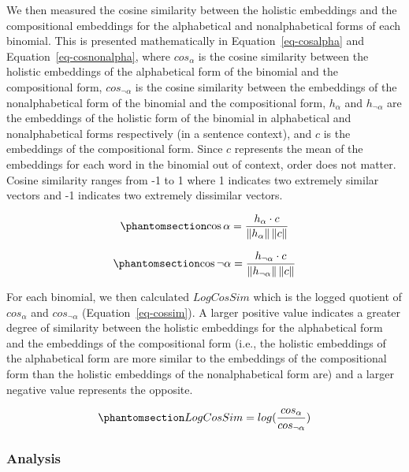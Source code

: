 \documentclass[
  12pt,
  letterpaper,
]{scrreprt}
\begin{document}
We then measured the cosine similarity between the holistic embeddings
and the compositional embeddings for the alphabetical and
nonalphabetical forms of each binomial. This is presented mathematically
in Equation~\ref{eq-cosalpha} and Equation~\ref{eq-cosnonalpha}, where
\(cos_\alpha\) is the cosine similarity between the holistic embeddings
of the alphabetical form of the binomial and the compositional form,
\(cos_{\neg\alpha}\) is the cosine similarity between the embeddings of
the nonalphabetical form of the binomial and the compositional form,
\(h_\alpha\) and \(h_{\neg\alpha}\) are the embeddings of the holistic
form of the binomial in alphabetical and nonalphabetical forms
respectively (in a sentence context), and \(c\) is the embeddings of the
compositional form. Since \(c\) represents the mean of the embeddings
for each word in the binomial out of context, order does not matter.
Cosine similarity ranges from -1 to 1 where 1 indicates two extremely
similar vectors and -1 indicates two extremely dissimilar vectors.

\begin{equation}\phantomsection\label{eq-cosalpha}{
\cos \alpha = \frac{h_\alpha \cdot c}{\left\lVert h_\alpha \right\rVert \left\lVert c \right\rVert}
}\end{equation}

\begin{equation}\phantomsection\label{eq-cosnonalpha}{
\cos \neg\alpha = \frac{h_{\neg\alpha} \cdot c}{\left\lVert h_{\neg\alpha}\right\rVert \left\lVert c \right\rVert}
}\end{equation}

For each binomial, we then calculated \(LogCosSim\) which is the logged
quotient of \(cos_\alpha\) and \(cos_{\neg\alpha}\)
(Equation~\ref{eq-cossim}). A larger positive value indicates a greater
degree of similarity between the holistic embeddings for the
alphabetical form and the embeddings of the compositional form (i.e.,
the holistic embeddings of the alphabetical form are more similar to the
embeddings of the compositional form than the holistic embeddings of the
nonalphabetical form are) and a larger negative value represents the
opposite.

\begin{equation}\phantomsection\label{eq-cossim}{
LogCosSim = log(\frac{cos_\alpha}{cos_{\neg\alpha}})
}\end{equation}

\subsubsection{Analysis}\label{analysis-4}
\end{document}
